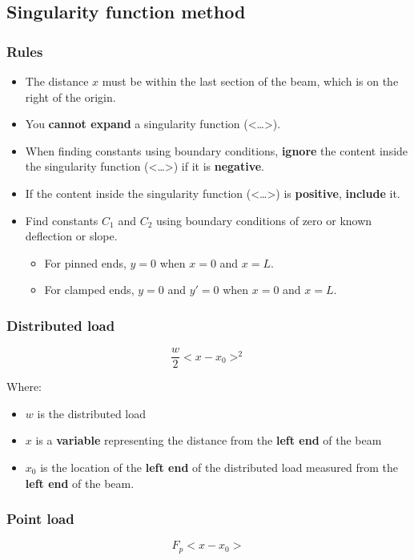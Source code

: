 \documentclass[11pt]{article}
\begin{document}
\newpage
\subsection{Singularity function method}
\label{sec:orgb28e010}

\subsubsection{Rules}
\label{sec:orgcfeaeb7}
\begin{itemize}
\item The distance \(x\) must be within the last section of the beam, which is on the right of the origin.
\item You \textbf{cannot expand} a singularity function (<\ldots{}>).
\item When finding constants using boundary conditions, \textbf{ignore} the content inside the singularity function (<\ldots{}>) if it is \textbf{negative}.
\item If the content inside the singularity function (<\ldots{}>) is \textbf{positive}, \textbf{include} it.
\item Find constants \(C_1\) and \(C_2\) using boundary conditions of zero or known deflection or slope.
\begin{itemize}
\item For pinned ends, \(y = 0\) when \(x = 0\) and \(x = L\).
\item For clamped ends, \(y = 0\) and \(y' = 0\) when \(x = 0\) and \(x = L\).
\end{itemize}
\end{itemize}
\subsubsection{Distributed load}
\label{sec:org13fdf75}
\[\frac{w}{2} < x - x_0 >^2\]

Where:
\begin{itemize}
\item \(w\) is the distributed load
\item \(x\) is a \textbf{variable} representing the distance from the \textbf{left end} of the beam
\item \(x_0\) is the location of the \textbf{left end} of the distributed load measured from the \textbf{left end} of the beam.
\end{itemize}
\subsubsection{Point load}
\label{sec:org7a3c528}
\[F_p < x - x_0 >\]
\end{document}
